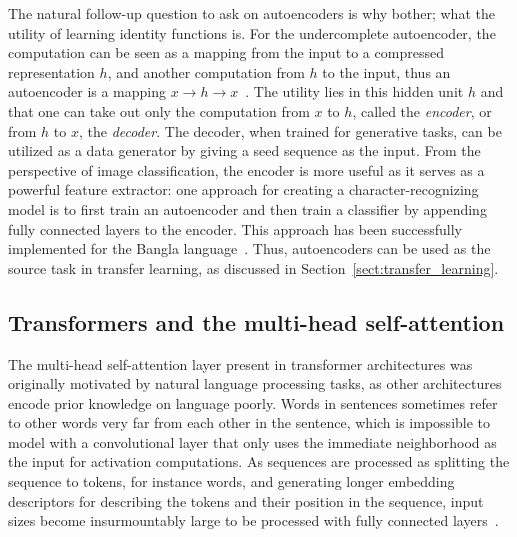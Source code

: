 \documentclass[english,twoside,openright]{UH_DS_MSc}
\begin{document}
The natural follow-up question to ask on autoencoders is why bother; what the utility 
of learning identity functions is. For the undercomplete autoencoder, the computation 
can be seen as a mapping from the input to a compressed representation $h$, and 
another computation from $h$ to the input, thus an autoencoder is a mapping $x\to h\to x$~\cite{goodfellow}.
The utility lies in this hidden unit $h$ and that one can take out only the 
computation from $x$ to $h$, called the \textit{encoder}, or from $h$ to $x$, the \textit{decoder}.
The decoder, when trained for generative tasks, can be utilized as a data generator by giving a seed 
sequence as the input.
From the perspective of image classification, the encoder is more useful as it serves 
as a powerful feature extractor: one approach for creating a character-recognizing model 
is to first train an autoencoder and then train a classifier by appending 
fully connected layers to the encoder. This approach has been successfully implemented for the Bangla language~\cite{6shoponBangla}.
Thus, autoencoders can be used as the source 
task in transfer learning, as discussed in Section~\ref{sect:transfer_learning}.

\subsection{Transformers and the multi-head self-attention}

The multi-head self-attention layer present in transformer architectures was
originally motivated by natural language processing tasks, as other architectures
encode prior knowledge on language poorly. Words in sentences sometimes refer to 
other words very far from each other in the sentence, which is impossible to model with a 
convolutional layer that only uses the immediate neighborhood as the input for activation computations.
As sequences are processed as splitting the sequence to tokens, for instance words, and generating 
longer embedding descriptors for describing the tokens and their position in the sequence, input sizes become insurmountably large 
to be processed with fully connected layers~\cite{princebook}.
\end{document}
